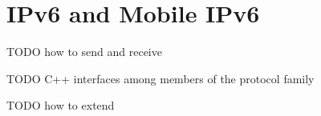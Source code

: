 \chapter{IPv6 and Mobile IPv6}
\label{cha:ipv6}

TODO how to send and receive

TODO C++ interfaces among members of the protocol family 

TODO how to extend



